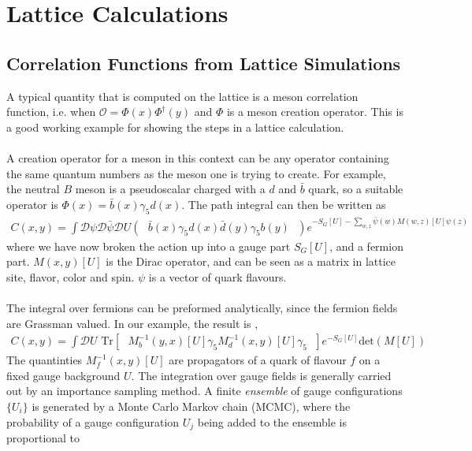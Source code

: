 \chapter{Lattice Calculations}
\label{chap:latticecalculations}

\section{Correlation Functions from Lattice Simulations}

A typical quantity that is computed on the lattice is a meson correlation function, i.e. when $\mathcal{O} = \Phi(x)\Phi^{\dagger}(y)$ and $\Phi$ is a meson creation operator. This is a good working example for showing the steps in a lattice calculation. 
\\ \\
A creation operator for a meson in this context can be any operator containing the same quantum numbers as the meson one is trying to create. For example, the neutral $B$ meson is a pseudoscalar charged with a $d$ and $\bar{b}$ quark, so a suitable operator is $\Phi(x) = \bar{b}(x)\gamma_5 d(x)$. The path integral can then be written as 
\begin{align}
	C(x,y) = \int \mathcal{D}\psi \mathcal{D}\bar{\psi} \mathcal{D}U \left(\text{ } \bar{b}(x)\gamma_5 d(x) \bar{d}(y)\gamma_5 b(y) \text{ }\right) e^{-S_G[U]-\sum_{w,z} \bar{\psi}(w)M(w,z)[U]\psi(z)}
\end{align}
where we have now broken the action up into a gauge part $S_G[U]$, and a fermion part. $M(x,y)[U]$ is the Dirac operator, and can be seen as a matrix in lattice site, flavor, color and spin. $\psi$ is a vector of quark flavours.
\\ \\
The integral over fermions can be preformed analytically, since the fermion fields are Grassman valued. In our example, the result is \cite{Peskin:1995ev},
\begin{align}
	C(x,y) = \int \mathcal{D}U \text{ Tr}\left[\text{ } M^{-1}_b(y,x)[U] \gamma_5 M^{-1}_d(x,y)[U] \gamma_5 \text{ }\right] e^{-S_G[U]} \text{det}(M[U])
\end{align}
The quantinties $M^{-1}_f(x,y)[U]$ are propagators of a quark of flavour $f$ on a fixed gauge background $U$. The integration over gauge fields is generally carried out by an importance sampling method. A finite \textit{ensemble} of gauge configurations $\{U_i\}$ is generated by a Monte Carlo Markov chain (MCMC), where the probability of a gauge configuration $U_j$ being added to the ensemble is proportional to 
